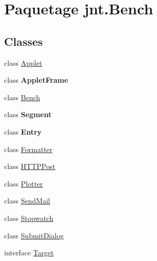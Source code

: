 \hypertarget{namespacejnt_1_1Bench}{\section{Paquetage jnt.\-Bench}
\label{namespacejnt_1_1Bench}
}
\subsection*{Classes}
\begin{DoxyCompactItemize}
\item 
class \hyperlink{classjnt_1_1Bench_1_1Applet}{Applet}
\item 
class {\bfseries Applet\-Frame}
\item 
class \hyperlink{classjnt_1_1Bench_1_1Bench}{Bench}
\item 
class {\bfseries Segment}
\item 
class {\bfseries Entry}
\item 
class \hyperlink{classjnt_1_1Bench_1_1Formatter}{Formatter}
\item 
class \hyperlink{classjnt_1_1Bench_1_1HTTPPost}{H\-T\-T\-P\-Post}
\item 
class \hyperlink{classjnt_1_1Bench_1_1Plotter}{Plotter}
\item 
class \hyperlink{classjnt_1_1Bench_1_1SendMail}{Send\-Mail}
\item 
class \hyperlink{classjnt_1_1Bench_1_1Stopwatch}{Stopwatch}
\item 
class \hyperlink{classjnt_1_1Bench_1_1SubmitDialog}{Submit\-Dialog}
\item 
interface \hyperlink{interfacejnt_1_1Bench_1_1Target}{Target}
\end{DoxyCompactItemize}
